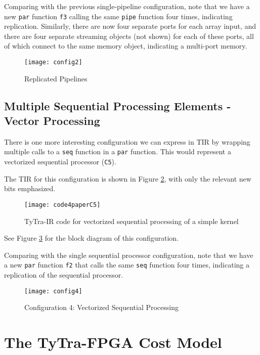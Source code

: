 \documentclass[]{heart2015_WN4Pre}
\begin{document}
Comparing with the previous single-pipeline configuration, note that we have a new \texttt{par} function \texttt{f3} calling the same \texttt{pipe} function four times, indicating replication. Similarly, there are now four separate ports for each array input, and there are four separate streaming objects (not shown) for each of these ports, all of which connect to the same memory object, indicating a multi-port memory.

\begin{figure}[th]
	\centering
	\texttt{[image: config2]}
	\caption[]{Replicated Pipelines}
	\label{fig:config2}
\end{figure}

\subsection{Multiple Sequential Processing Elements - Vector Processing}
\label{sec:illustration-config4}

There is one more interesting configuration we can express in TIR by wrapping multiple calls to a \texttt{seq} function in a \texttt{par} function. This would represent a vectorized sequential processor (\texttt{C5}). 

The TIR for this configuration is shown in Figure \ref{fig:code4paperC5}, with only the relevant new bits emphasized. 

\begin{figure}[th]
	\centering
	\texttt{[image: code4paperC5]}
	\caption{TyTra-IR code for vectorized sequential processing of a simple kernel}
	\label{fig:code4paperC5}
\end{figure}

See Figure \ref{fig:config4} for the block diagram of this configuration.

Comparing with the single sequential processor configuration, note that we have a new \verb|par| function \verb|f2| that calls the same \verb|seq| function four times, indicating a replication of the sequential processor.

\begin{figure}[th]
	\centering
	\texttt{[image: config4]}
	\caption[]{Configuration 4: Vectorized Sequential Processing}
	\label{fig:config4}
\end{figure}

\section{The TyTra-FPGA Cost Model} 
\label{sec:estimation-model}
\end{document}
